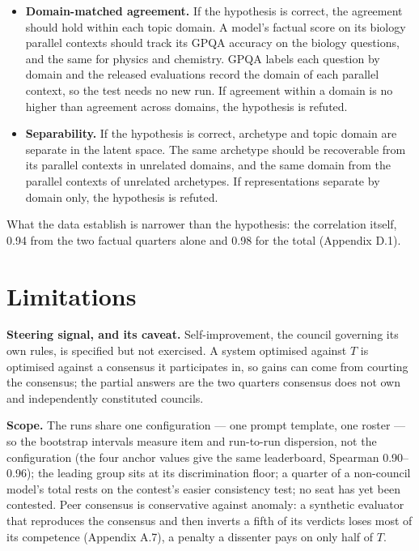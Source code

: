 \documentclass{article}
\providecommand{\tightlist}{\setlength{\itemsep}{0pt}\setlength{\parskip}{0pt}}
\begin{document}
\begin{itemize}
\tightlist
\item
  \textbf{Domain-matched agreement.} If the hypothesis is correct, the agreement should hold within each topic domain. A model's factual score on its biology parallel contexts should track its GPQA accuracy on the biology questions, and the same for physics and chemistry. GPQA labels each question by domain and the released evaluations record the domain of each parallel context, so the test needs no new run. If agreement within a domain is no higher than agreement across domains, the hypothesis is refuted.
\item
  \textbf{Separability.} If the hypothesis is correct, archetype and topic domain are separate in the latent space. The same archetype should be recoverable from its parallel contexts in unrelated domains, and the same domain from the parallel contexts of unrelated archetypes. If representations separate by domain only, the hypothesis is refuted.
\end{itemize}

What the data establish is narrower than the hypothesis: the correlation itself, 0.94 from the two factual quarters alone and 0.98 for the total (Appendix D.1).

\section{Limitations}\label{limitations}

\textbf{Steering signal, and its caveat.} Self-improvement, the council governing its own rules, is specified but not exercised. A system optimised against \(T\) is optimised against a consensus it participates in, so gains can come from courting the consensus; the partial answers are the two quarters consensus does not own and independently constituted councils.

\textbf{Scope.} The runs share one configuration --- one prompt template, one roster --- so the bootstrap intervals measure item and run-to-run dispersion, not the configuration (the four anchor values give the same leaderboard, Spearman 0.90--0.96); the leading group sits at its discrimination floor; a quarter of a non-council model's total rests on the contest's easier consistency test; no seat has yet been contested. Peer consensus is conservative against anomaly: a synthetic evaluator that reproduces the consensus and then inverts a fifth of its verdicts loses most of its competence (Appendix A.7), a penalty a dissenter pays on only half of \(T\).
\end{document}
